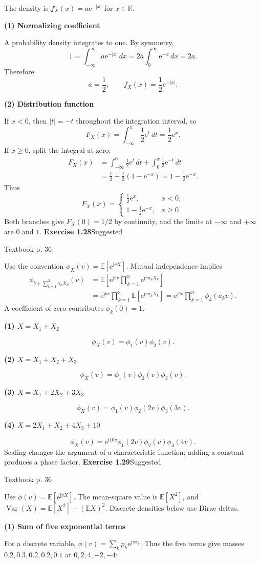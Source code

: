 \documentclass[a4paper,11pt]{article}
\newcommand{\E}{\mathbb E}\newcommand{\Var}{\operatorname{Var}}\newcommand{\Cov}{\operatorname{Cov}}
\newcommand{\jj}{\mathrm j}\newcommand{\ee}{\mathrm e}
\newcommand{\problem}[3]{{\LARGE\bfseries Exercise #1}\hfill #2\par{\small\color{gray}Textbook p. #3}\par\vspace{3mm}}
\newcommand{\step}[1]{\par\textbf{#1}\par}
\begin{document}
The density is $f_X(x)=a\ee^{-|x|}$ for $x\in\mathbb R$.
\step{(1) Normalizing coefficient}
A probability density integrates to one. By symmetry,
\[
1=\int_{-\infty}^{\infty}a\ee^{-|x|}\,dx
=2a\int_0^{\infty}\ee^{-x}\,dx=2a.
\]
Therefore
\[
\boxed{a=\frac12},\qquad f_X(x)=\frac12\ee^{-|x|}.
\]
\step{(2) Distribution function}
If $x<0$, then $|t|=-t$ throughout the integration interval, so
\[
F_X(x)=\int_{-\infty}^x\frac12\ee^t\,dt=\frac12\ee^x.
\]
If $x\ge0$, split the integral at zero:
\begin{align*}
F_X(x)&=\int_{-\infty}^0\frac12\ee^t\,dt
+\int_0^x\frac12\ee^{-t}\,dt\\
&=\frac12+\frac12(1-\ee^{-x})=1-\frac12\ee^{-x}.
\end{align*}
Thus
\[
\boxed{F_X(x)=\begin{cases}
\tfrac12\ee^x,&x<0,\\[1mm]
1-\tfrac12\ee^{-x},&x\ge0.
\end{cases}}
\]
Both branches give $F_X(0)=1/2$ by continuity, and the limits at $-\infty$ and $+\infty$ are $0$ and $1$.
\newpage
\problem{1.28}{Suggested}{36}
Use the convention $\phi_X(v)=\E[\ee^{\jj vX}]$. Mutual independence implies
\begin{align*}
\phi_{b+\sum_{k=1}^3a_kX_k}(v)
&=\E\!\left[\ee^{\jj bv}\prod_{k=1}^3\ee^{\jj va_kX_k}\right]\\
&=\ee^{\jj bv}\prod_{k=1}^3\E[\ee^{\jj va_kX_k}]
=\ee^{\jj bv}\prod_{k=1}^3\phi_k(a_kv).
\end{align*}
A coefficient of zero contributes $\phi_k(0)=1$.
\step{(1) $X=X_1+X_2$}
\[
\boxed{\phi_X(v)=\phi_1(v)\phi_2(v).}
\]
\step{(2) $X=X_1+X_2+X_3$}
\[
\boxed{\phi_X(v)=\phi_1(v)\phi_2(v)\phi_3(v).}
\]
\step{(3) $X=X_1+2X_2+3X_3$}
\[
\boxed{\phi_X(v)=\phi_1(v)\phi_2(2v)\phi_3(3v).}
\]
\step{(4) $X=2X_1+X_2+4X_3+10$}
\[
\boxed{\phi_X(v)=\ee^{\jj10v}\phi_1(2v)\phi_2(v)\phi_3(4v).}
\]
Scaling changes the argument of a characteristic function; adding a constant produces a phase factor.
\newpage
\problem{1.29}{Suggested}{36}
Use $\phi(v)=\E[\ee^{\jj vX}]$. The mean-square value is $\E[X^2]$, and
$\Var(X)=\E[X^2]-(\E X)^2$. Discrete densities below use Dirac deltas.
\step{(1) Sum of five exponential terms}
For a discrete variable, $\phi(v)=\sum_k p_k\ee^{\jj vx_k}$.
Thus the five terms give masses $0.2,0.3,0.2,0.2,0.1$ at $0,2,4,-2,-4$:
\end{document}
